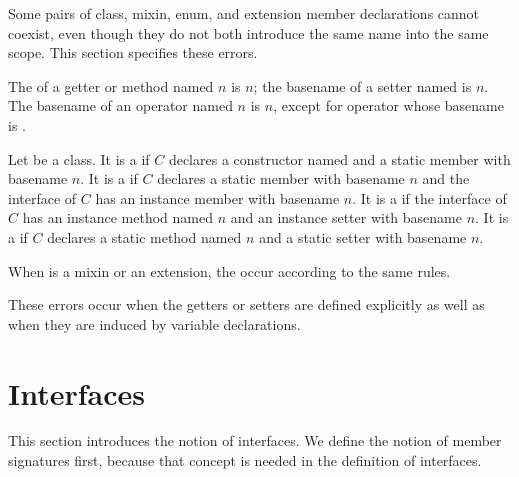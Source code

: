 \documentclass[makeidx]{article}
\begin{document}
\LMHash{}%
Some pairs of class, mixin, enum, and extension member declarations
cannot coexist,
even though they do not both introduce the same name into the same scope.
This section specifies these errors.

\LMHash{}%
The  of a getter or method named $n$ is $n$;
the basename of a setter named  is $n$.
The basename of an operator named $n$ is $n$,
except for operator \code{[]=} whose basename is \code{[]}.

\LMHash{}%
Let  be a class.
It is a  if $C$
declares a constructor named  and
a static member with basename $n$.
It is a  if $C$
declares a static member with basename $n$ and
the interface of $C$ has an instance member with basename $n$.
It is a  if the interface of $C$
has an instance method named $n$ and an instance setter with basename $n$.
It is a  if $C$ declares a static method named $n$
and a static setter with basename $n$.

\LMHash{}%
When  is a mixin or an extension,
the  occur according to the same rules.

\LMHash{}%
These errors occur when the getters or setters are defined explicitly
as well as when they are induced by variable declarations.



\section{Interfaces}

\LMHash{}%
This section introduces the notion of interfaces.
We define the notion of member signatures first,
because that concept is needed in the definition of interfaces.
\end{document}
